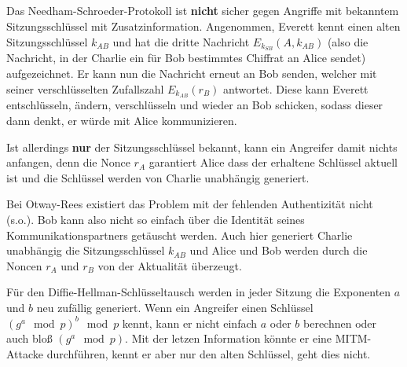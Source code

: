 \documentclass{../crypto}
\begin{document}

\subsection{}

Das Needham-Schroeder-Protokoll ist \textbf{nicht} sicher gegen Angriffe mit
bekanntem Sitzungsschlüssel mit Zusatzinformation. Angenommen, Everett kennt einen alten
Sitzungsschlüssel $k_{AB}$ und hat die dritte Nachricht $E_{k_{SB}}(A,k_{AB})$
(also die Nachricht, in der Charlie ein für Bob bestimmtes Chiffrat an Alice
sendet) aufgezeichnet. Er kann nun die Nachricht erneut an Bob senden, welcher
mit seiner verschlüsselten Zufallszahl $E_{k_{AB}}(r_B)$ antwortet. Diese kann
Everett entschlüsseln, ändern, verschlüsseln und wieder an Bob schicken, sodass
dieser dann denkt, er würde mit Alice kommunizieren.

Ist allerdings \textbf{nur} der Sitzungsschlüssel bekannt, kann ein Angreifer
damit nichts anfangen, denn die Nonce $r_A$ garantiert Alice dass der erhaltene
Schlüssel aktuell ist und die Schlüssel werden von Charlie unabhängig generiert.

Bei Otway-Rees existiert das Problem mit der fehlenden Authentizität nicht
(s.o.). Bob kann also nicht so einfach über die Identität seines
Kommunikationspartners getäuscht werden. Auch hier generiert Charlie unabhängig
die Sitzungsschlüssel $k_{AB}$ und Alice und Bob werden durch die Noncen $r_A$
und $r_B$ von der Aktualität überzeugt.



Für den Diffie-Hellman-Schlüsseltausch werden in jeder Sitzung die Exponenten
$a$ und $b$ neu zufällig generiert. Wenn ein Angreifer einen Schlüssel $(g^a \mod
p)^b \mod p$ kennt, kann er nicht einfach $a$ oder $b$ berechnen oder auch bloß
$(g^a \mod p)$. Mit der letzen Information könnte er eine MITM-Attacke
durchführen, kennt er aber nur den alten Schlüssel, geht dies nicht.
\end{document}
